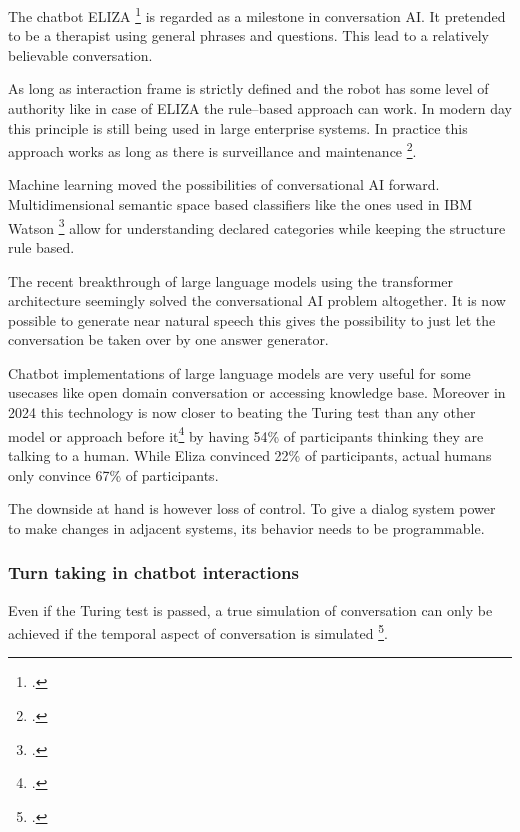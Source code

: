 \documentclass[12pt]{report}
\begin{document}
{\par
The chatbot ELIZA \footcite{weizenbaum1966eliza} is regarded as a milestone in conversation AI.
It pretended to be a therapist
using general phrases and questions.
This lead to a relatively believable conversation.

As long as interaction frame is strictly defined and
the robot has some level of authority
like in case of ELIZA
the rule–based approach can work.
In modern day this principle is still being used in large enterprise systems.
In practice this approach works as long as there is surveillance and maintenance \footcite{kolosova2022}.

\par
Machine learning moved the possibilities of conversational AI forward.
Multidimensional semantic space based classifiers like the ones used in IBM Watson \footcite{building_watson_2010}
allow for understanding declared categories while keeping the structure rule based.

\par
The recent breakthrough of large language models using the transformer architecture
seemingly solved the conversational AI problem altogether.
It is now possible to generate near natural speech
this gives the possibility to just let the conversation be taken over by one answer generator.

Chatbot implementations of large language models are very useful for some usecases
like open domain conversation or accessing knowledge base.
Moreover in 2024 this technology is now closer to beating the Turing test than
any other model or approach before it\footcite{jones2024peopledistinguishgpt4human}
by having 54\% of participants thinking
they are talking to a human.
While Eliza convinced 22\% of participants,
actual humans only convince 67\% of participants.

\par The downside at hand is however loss of control.
To give a dialog system power to make changes in adjacent systems,
its behavior needs to be programmable.

\subsubsection{Turn taking in chatbot interactions}

\par
Even if the Turing test is passed,
a true simulation of conversation
can only be achieved if the temporal aspect of conversation
is simulated \footcite{optimizing-turn-taking}.

}
\end{document}
